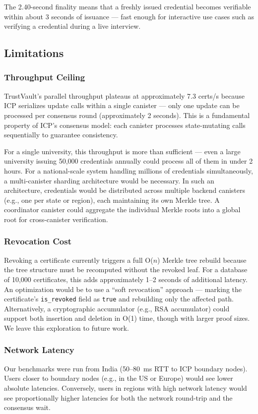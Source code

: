 \documentclass[journal]{IEEEtran}
\begin{document}
The 2.40-second finality means that a freshly issued credential becomes verifiable within about 3 seconds of issuance — fast enough for interactive use cases such as verifying a credential during a live interview.

\subsection{Limitations}

\subsubsection{Throughput Ceiling}
TrustVault's parallel throughput plateaus at approximately 7.3 certs/s because ICP serializes update calls within a single canister — only one update can be processed per consensus round (approximately 2 seconds). This is a fundamental property of ICP's consensus model: each canister processes state-mutating calls sequentially to guarantee consistency.

For a single university, this throughput is more than sufficient — even a large university issuing 50,000 credentials annually could process all of them in under 2 hours. For a national-scale system handling millions of credentials simultaneously, a multi-canister sharding architecture would be necessary. In such an architecture, credentials would be distributed across multiple backend canisters (e.g., one per state or region), each maintaining its own Merkle tree. A coordinator canister could aggregate the individual Merkle roots into a global root for cross-canister verification.

\subsubsection{Revocation Cost}
Revoking a certificate currently triggers a full O($n$) Merkle tree rebuild because the tree structure must be recomputed without the revoked leaf. For a database of 10,000 certificates, this adds approximately 1--2 seconds of additional latency. An optimization would be to use a ``soft revocation'' approach — marking the certificate's \texttt{is\_revoked} field as \texttt{true} and rebuilding only the affected path. Alternatively, a cryptographic accumulator (e.g., RSA accumulator) could support both insertion and deletion in O(1) time, though with larger proof sizes. We leave this exploration to future work.

\subsubsection{Network Latency}
Our benchmarks were run from India (50--80~ms RTT to ICP boundary nodes). Users closer to boundary nodes (e.g., in the US or Europe) would see lower absolute latencies. Conversely, users in regions with high network latency would see proportionally higher latencies for both the network round-trip and the consensus wait.
\end{document}
